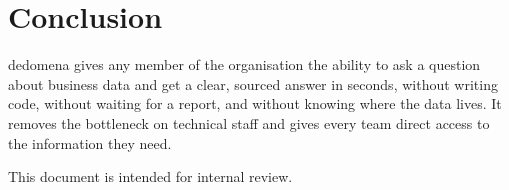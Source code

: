 \documentclass[12pt, a4paper]{article}
\begin{document}
\section*{Conclusion}

dedomena gives any member of the organisation the ability to ask a question about
business data and get a clear, sourced answer in seconds, without writing code,
without waiting for a report, and without knowing where the data lives. It removes
the bottleneck on technical staff and gives every team direct access to the
information they need.

\vspace{1.5em}
\noindent\textcolor{black!40}{\small This document is intended for internal review.}
\end{document}
